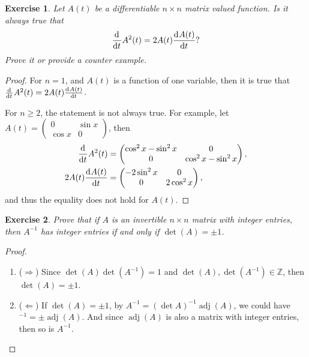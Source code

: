 \documentclass[11pt]{article}
\newtheorem{exercise}{Exercise}[section]
\theoremstyle{definition}
\numberwithin{equation}{subsection}
\begin{document}
\medskip

\begin{exercise}
Let $A(t)$ be a differentiable $n \times n$ matrix valued function. Is it always true that 
\begin{align*}
    \dv[]{}{t} A^2(t) = 2 A(t) \dv[]{A(t)}{t}?
\end{align*}
Prove it or provide a counter example.
\end{exercise}
\begin{proof}
For $n = 1$, and $A(t)$ is a function of one variable, then it is true that $\dv[]{}{t} A^2(t) = 2 A(t) \dv[]{A(t)}{t}$.

For $n \geq 2$, the statement is not always true. For example, let $A(t) = \begin{pmatrix} 0 & \sin x \\ \cos x & 0 \end{pmatrix}$, then
\begin{align*}
    \dv[]{}{t} A^2(t) & = \begin{pmatrix} \cos^2 x - \sin^2 x & 0 \\ 0 & \cos^2 x - \sin^2 x \end{pmatrix}, \\
    2 A(t) \dv[]{A(t)}{t} & = \begin{pmatrix} -2\sin^2 x & 0 \\ 0 & 2\cos^2 x \end{pmatrix},
\end{align*}
and thus the equality does not hold for $A(t)$.
\end{proof}

\medskip

\begin{exercise}
Prove that if $A$ is an invertible $n \times n$ matrix with integer entries, then $A^{-1}$ has integer entries if and only if $\det(A) = \pm 1$.
\end{exercise}
\begin{proof}
~\begin{enumerate}[label=(\alph*)]
    \item ($\Rightarrow$) Since $\det (A) \det (A^{-1}) = 1$ and $\det (A), \det (A^{-1}) \in \mathbb{Z}$, then $\det(A) = \pm 1$.
    
    \item ($\Leftarrow$) If $\det(A) = \pm 1$, by $A^{-1} = (\det A)^{-1} \operatorname{adj}(A)$, we could have $^{-1} = \pm \operatorname{adj}(A)$. And since $\operatorname{adj}(A)$ is also a matrix with integer entries, then so is $A^{-1}$.
\end{enumerate}
\end{proof}
\end{document}
